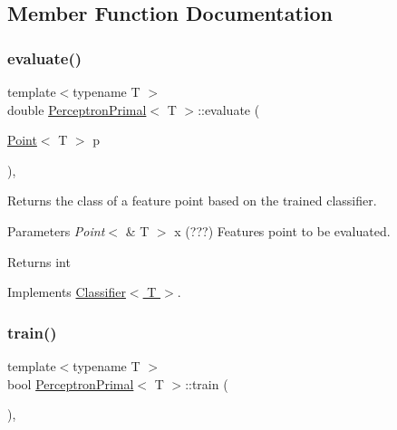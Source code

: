 \subsection{Member Function Documentation}
\mbox{\label{class_perceptron_primal_a547d98d8d61480d5bc44fe759c3a8e28}} 
\subsubsection{\texorpdfstring{evaluate()}{evaluate()}}
{\footnotesize\ttfamily template$<$typename T $>$ \\
double \hyperlink{class_perceptron_primal}{Perceptron\+Primal}$<$ T $>$\+::evaluate (\begin{DoxyParamCaption}\item[{\hyperlink{class_point}{Point}$<$ T $>$}]{p }\end{DoxyParamCaption})\hspace{0.3cm}{\ttfamily [override]}, {\ttfamily [virtual]}}



Returns the class of a feature point based on the trained classifier. 


\begin{DoxyParams}{Parameters}
{\em Point$<$} & T $>$ x (???) Features point to be evaluated. \\
\hline
\end{DoxyParams}
\begin{DoxyReturn}{Returns}
int 
\end{DoxyReturn}


Implements \hyperlink{class_classifier_ab3b9544a8d9c3cbde8d5865c7e9be0fb}{Classifier$<$ T $>$}.

\mbox{\label{class_perceptron_primal_ac6cafe7a8fabfb607761024ce60a6861}} 
\subsubsection{\texorpdfstring{train()}{train()}}
{\footnotesize\ttfamily template$<$typename T $>$ \\
bool \hyperlink{class_perceptron_primal}{Perceptron\+Primal}$<$ T $>$\+::train (\begin{DoxyParamCaption}{ }\end{DoxyParamCaption})\hspace{0.3cm}{\ttfamily [override]}, {\ttfamily [virtual]}}



